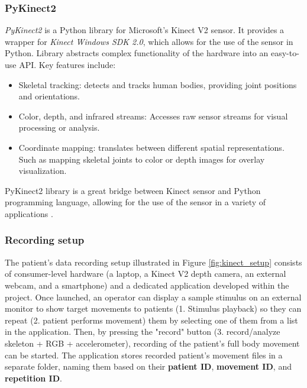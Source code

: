                     \subsubsection{PyKinect2}
                        \textit{PyKinect2} is a Python library for Microsoft's Kinect V2 sensor. It provides a wrapper for \textit{Kinect Windows SDK 2.0}, which allows for the use of the sensor in Python. Library abstracts complex functionality of the hardware into an easy-to-use API. Key features include:
                        \begin{itemize}
                            \item Skeletal tracking: detects and tracks human bodies, providing joint positions and orientations.
                            \item Color, depth, and infrared streams: Accesses raw sensor streams for visual processing or analysis.
                            \item Coordinate mapping: translates between different spatial representations. Such as mapping skeletal joints to color or depth images for overlay visualization.
                        \end{itemize}
                        PyKinect2 library is a great bridge between Kinect sensor and Python programming language, allowing for the use of the sensor in a variety of applications \cite{GitHubKinectPyKinect2}.
               
                        \newpage
                        
        \subsubsection{Recording setup}

                    The patient's data recording setup illustrated in Figure \ref{fig:kinect_setup} consists of consumer-level hardware (a laptop, a Kinect V2 depth camera, an external webcam, and a smartphone) and a dedicated application developed within the project. 
                    Once launched, an operator can display a sample stimulus on an external monitor to show target movements to patients (1. Stimulus playback) so they can repeat (2. patient performs movement) them by selecting one of them from a list in the application.
                    Then, by pressing the "record" button (3. record/analyze skeleton + RGB + accelerometer), recording of the patient's full body movement can be started. 
                    The application stores recorded patient's movement files in a separate folder, naming them based on their \textbf{patient ID}, \textbf{movement ID}, and \textbf{repetition ID}.

